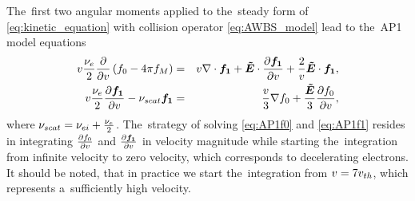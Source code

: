 The~first two angular moments applied to the~steady form of 
\eqref{eq:kinetic_equation} with collision operator \eqref{eq:AWBS_model} 
lead to the~AP1 model equations
\begin{eqnarray}
  v\frac{\nu_{e}}{2}\frac{\partial{}}{\partial{v}}\left(f_0 - 4\pi f_M \right) &=&
  v\nabla\cdot\boldsymbol{f_1} + \boldsymbol{\tilde{E}}\cdot
  \frac{\partial{\boldsymbol{f_1}}}{\partial{v}} + \frac{2}{v}\boldsymbol{\tilde{E}}\cdot\boldsymbol{f_1} , 
  \label{eq:AP1f0}\\
  v\frac{\nu_{e}}{2}\frac{\partial{\boldsymbol{f_1}}}{\partial{v}}
  - \nu_{scat}\boldsymbol{f_1} &=& 
  \frac{v}{3}\nabla f_0 + 
  \frac{\boldsymbol{\tilde{E}}}{3}\frac{\partial{f_0}}{\partial{v}} ,
  \label{eq:AP1f1}
\end{eqnarray}
where $\nu_{scat} = \nu_{ei} + \frac{\nu_{e}}{2}$. The~strategy of solving 
\eqref{eq:AP1f0} and \eqref{eq:AP1f1} resides in integrating 
$\frac{\partial{f_0}}{\partial{v}}$
and $\frac{\partial{\boldsymbol{f_1}}}{\partial{v}}$ in velocity magnitude while starting the~integration
from infinite velocity to zero velocity, which corresponds to decelerating 
electrons. It should be noted, that in practice we start the~integration from
$v = 7 v_{th}$, which represents a~sufficiently high velocity.

